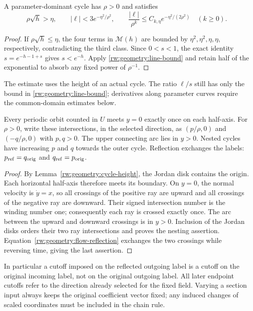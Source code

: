 \begin{lemma}\label{rw:geometry:flatness}
A parameter-dominant cycle has $\rho>0$ and satisfies
\[
 \rho\sqrt h>\eta,\qquad
 |\ell|<3e^{-\eta^2/\rho^2},\qquad
 \frac{|\ell|}{\rho^k}\le C_{k,\eta}
                  e^{-\eta^2/(2\rho^2)}\quad(k\ge0).
\]
\end{lemma}
\begin{proof}
If $\rho\sqrt h\le\eta$, the four terms in $\mathscr M(h)$ are
bounded by $\eta^2,\eta^2,\eta,\eta$, respectively, contradicting
the third class.  Since $0<s<1$, the exact identity
$s=e^{-h-1+s}$ gives $s<e^{-h}$.  Apply
\eqref{rw:geometry:line-bound} and retain half of the exponential to
absorb any fixed power of $\rho^{-1}$.
\end{proof}
The estimate uses the height of an actual cycle.  The ratio $\ell/s$
still has only the bound in \eqref{rw:geometry:line-bound}; derivatives
along parameter curves require the common-domain estimates below.

\begin{lemma}\label{rw:geometry:endpoints}
Every periodic orbit counted in $U$ meets $y=0$ exactly once on each
half-axis.  For $\rho>0$, write these intersections, in the selected
direction, as $(p/\rho,0)$ and $(-q/\rho,0)$ with $p,q>0$.
The upper connecting arc lies in $y>0$.  Nested cycles have increasing
$p$ and $q$ towards the outer cycle.  Reflection exchanges the labels:
$p_{\rm ref}=q_{\rm orig}$ and $q_{\rm ref}=p_{\rm orig}$.
\end{lemma}
\begin{proof}
By Lemma~\ref{rw:geometry:cycle-height}, the Jordan disk contains
the origin.  Each horizontal half-axis therefore meets its boundary.
On $y=0$, the normal velocity is $\dot y=x$, so all crossings of
the positive ray are upward and all crossings of the negative ray
are downward.  Their signed intersection number is the winding number
one; consequently each ray is crossed exactly once.  The arc between
the upward and downward crossings is in $y>0$.  Inclusion of the
Jordan disks orders their two ray intersections and proves the nesting
assertion.  Equation~\eqref{rw:geometry:flow-reflection} exchanges the
two crossings while reversing time, giving the last assertion.
\end{proof}

In particular a cutoff imposed on the reflected outgoing label is a
cutoff on the original incoming label, not on the original outgoing
label.  All later endpoint cutoffs refer to the direction already
selected for the fixed field.  Varying a section input always keeps
the original coefficient vector fixed; any induced changes of scaled
coordinates must be included in the chain rule.

